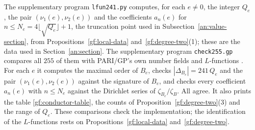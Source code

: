 \begin{remark}\label{gf:checks}
The supplementary program \texttt{lfun241.py} computes, for each $e\ne0$,
the integer $Q_e$, the pair $(\nu_1(e),\nu_2(e))$ and the coefficients
$a_n(e)$ for $n\le N_e=4\lfloor\sqrt{Q_e}\rfloor+1$, the truncation point
used in Subsection~\ref{an:value-section}, from
Propositions~\ref{gf:local-data} and~\ref{gf:degree-two}(1); these are the
data used in Section~\ref{an:section}. The supplementary program
\texttt{check255.gp} compares all $255$ of them with PARI/GP's own number
fields and $L$-functions \cite{PARI}. For each $e$ it computes the maximal
order of $B_e$, checks $|\Delta_{B_e}|=241\,Q_e$ and the pair
$(\nu_1(e),\nu_2(e))$ against the signature of $B_e$, and checks every
coefficient $a_n(e)$ with $n\le N_e$
against the Dirichlet series of $\zeta_{B_e}/\zeta_B$. All agree. It also
prints the table \eqref{gf:conductor-table}, the counts of
Proposition~\ref{gf:degree-two}(3) and the range of $Q_e$. These comparisons
check the implementation; the identification of the $L$-functions rests on
Propositions~\ref{gf:local-data} and~\ref{gf:degree-two}.
\end{remark}
